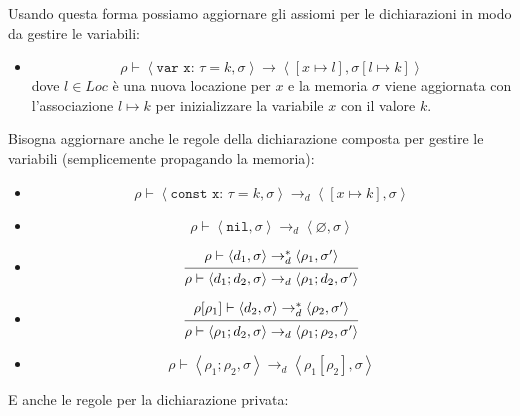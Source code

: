 \documentclass[a4paper]{article}
\begin{document}
Usando questa forma possiamo aggiornare gli assiomi per le dichiarazioni in modo da
gestire le variabili:
\begin{itemize}
  \item
    \[
      \rho \vdash \left< \texttt{var x: } \tau = k, \sigma \right> \to 
      \left< \left[ x \mapsto l \right], \sigma[l \mapsto k] \right>
    \] 
    dove \( l \in Loc \) è una nuova locazione per \( x \) e la memoria \( \sigma \)
    viene aggiornata con l'associazione \( l \mapsto k \) per inizializzare la
    variabile \( x \) con il valore \( k \).
\end{itemize}
Bisogna aggiornare anche le regole della dichiarazione composta
per gestire le variabili (semplicemente propagando la memoria):
\begin{itemize}
  \item 
    \[
      \rho \vdash \left< \texttt{const x: } \tau = k, \sigma \right> \to_d
      \left< \left[ x \mapsto k \right], \sigma \right>
    \] 

  \item
    \[
      \rho \vdash \left< \texttt{nil}, \sigma \right> \to_d
      \left< \varnothing, \sigma \right>
    \] 

  \item 
    \[
      \begin{prooftree}
        \hypo{ 
          \rho \vdash \left< d_1, \sigma \right> \to^*_d \left< \rho_1, \sigma' \right>
        }
        \infer1{ 
          \rho \vdash \left< d_1 ; d_2, \sigma \right> \to_d
          \left< \rho_1 ; d_2, \sigma' \right>
        }
      \end{prooftree}
    \] 

  \item 
    \[
      \begin{prooftree}
        \hypo{ 
          \rho[\rho_1] \vdash \left< d_2, \sigma \right> \to^*_d \left< \rho_2,
          \sigma' \right>
        }
        \infer1{ 
          \rho \vdash \left< \rho_1; d_2, \sigma \right> \to_d
          \left< \rho_1; \rho_2, \sigma' \right>
        }
      \end{prooftree}
    \] 

  \item
    \[
      \rho \vdash \left< \rho_1; \rho_2, \sigma \right> \to_d
      \left< \rho_1[\rho_2], \sigma \right>
    \] 
\end{itemize}
E anche le regole per la dichiarazione privata:
\end{document}
